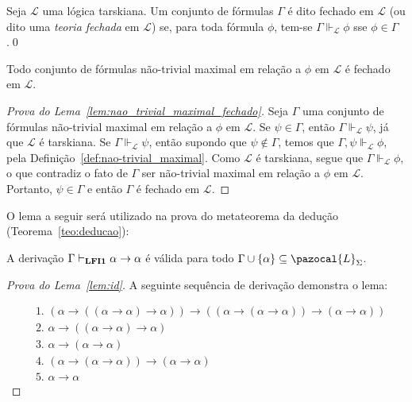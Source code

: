     \begin{definicao}\label{def:fechada}

        Seja $\mathcal{L}$ uma lógica tarskiana. Um conjunto de fórmulas $\Gamma$ é dito fechado em $\mathcal{L}$ (ou dito uma \textit{teoria fechada} em $\mathcal{L}$) se, para toda fórmula $\phi$, tem-se $\Gamma \Vdash_{\mathcal{L}} \phi$ sse $\phi \in \Gamma$.\qed{}
    \end{definicao}

    \begin{lema}\label{lem:nao_trivial_maximal_fechado}
        Todo conjunto de fórmulas não-trivial maximal em relação a $\phi$ em $\mathcal{L}$ é fechado em $\mathcal{L}$.
    \end{lema}

    \begin{proof}[Prova do Lema~\ref{lem:nao_trivial_maximal_fechado}]
        Seja $\Gamma$ uma conjunto de fórmulas não-trivial maximal em relação a $\phi$ em $\mathcal{L}$. Se $\psi \in \Gamma$, então $\Gamma \Vdash_{\mathcal{L}} \psi$, já que $\mathcal{L}$ é tarskiana. Se $\Gamma \Vdash_{\mathcal{L}} \psi$, então supondo que $\psi \notin \Gamma$, temos que $\Gamma, \psi \Vdash_{\mathcal{L}} \phi$, pela Definição~\ref{def:nao-trivial_maximal}. Como $\mathcal{L}$ é tarskiana, segue que $\Gamma \Vdash_{\mathcal{L}} \phi$, o que contradiz o fato de $\Gamma$ ser não-trivial maximal em relação a $\phi$ em $\mathcal{L}$. Portanto, $\psi \in \Gamma$ e então $\Gamma$ é fechado em $\mathcal{L}$.
    \end{proof}


    O lema a seguir será utilizado na prova do metateorema da dedução (Teorema~\ref{teo:deducao}):
    \begin{lema}\label{lem:id}
        A derivação $\Gamma \vdash_{\textbf{LFI1}{}} \alpha \to \alpha$ é válida para todo $\Gamma \cup \{\alpha\} \subseteq \pazocal{L}_{\Sigma}$.
    \end{lema}
    
    \begin{proof}[Prova do Lema~\ref{lem:id}]
        A seguinte sequência de derivação demonstra o lema:
        
        \begin{align*}
            & \text{1. } (\alpha \to ((\alpha \to \alpha) \to \alpha)) \to ((\alpha \to (\alpha \to \alpha)) \to (\alpha \to \alpha))\tag{Ax2}\\
            & \text{2. } \alpha \to ((\alpha \to \alpha) \to \alpha)\tag{Ax1}\\
            & \text{3. } \alpha \to (\alpha \to \alpha)\tag{Ax1}\\
            & \text{4. } (\alpha \to (\alpha \to \alpha)) \to (\alpha \to \alpha)\tag{MP 1,2}\\
            & \text{5. } \alpha \to \alpha\tag{MP 3,4}
        \end{align*}
    \end{proof}
    
